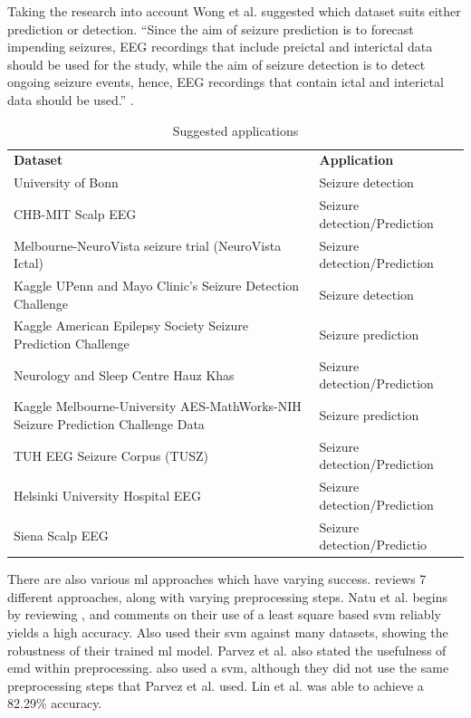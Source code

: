 \documentclass[12pt]{article}
\begin{document}
Taking the research into account Wong et al. suggested which dataset suits either prediction or detection. ``Since the aim of seizure prediction is to forecast impending seizures, EEG recordings that include preictal and interictal data should be used for the study, while the aim of seizure detection is to detect ongoing seizure events, hence, EEG recordings that contain ictal and interictal data should be used.'' \cite{wong2023eeg}.

\begin{table}[H]
\centering
\begin{tabular}{p{}p{}}
\textbf{Dataset}                     & \textbf{Application}         \\
University of Bonn                   & Seizure detection            \\
CHB-MIT Scalp EEG                    & Seizure detection/Prediction \\
Melbourne-NeuroVista seizure trial (NeuroVista Ictal)                           & Seizure detection/Prediction \\
Kaggle UPenn and Mayo Clinic's Seizure Detection Challenge                      & Seizure detection            \\
Kaggle American Epilepsy Society Seizure Prediction Challenge                   & Seizure prediction           \\
Neurology and Sleep Centre Hauz Khas & Seizure detection/Prediction \\
Kaggle Melbourne-University AES-MathWorks-NIH Seizure Prediction Challenge Data & Seizure prediction           \\
TUH EEG Seizure Corpus (TUSZ)        & Seizure detection/Prediction \\
Helsinki University Hospital EEG     & Seizure detection/Prediction \\
Siena Scalp EEG                      & Seizure detection/Predictio 
\end{tabular}
\caption{Suggested applications  \protect\cite{wong2023eeg}}
\end{table} 


There are also various \acrshort{ml} approaches which have varying success. \cite{natu2022review} reviews 7 different approaches, along with varying preprocessing steps. Natu et al. begins by reviewing \cite{parvez2015epileptic}, and comments on their use of a least square based \acrshort{svm} reliably yields a high accuracy. \cite{parvez2015epileptic} Also used their \acrshort{svm} against many datasets, showing the robustness of their trained \acrshort{ml} model. 
Parvez et al. also stated the usefulness of \acrshort{emd} within preprocessing. \cite{lin2009eeg} also used a \acrshort{svm}, although they did not use the same preprocessing steps that Parvez et al. used. Lin et al. was able to achieve a 82.29\% accuracy.  
\end{document}
